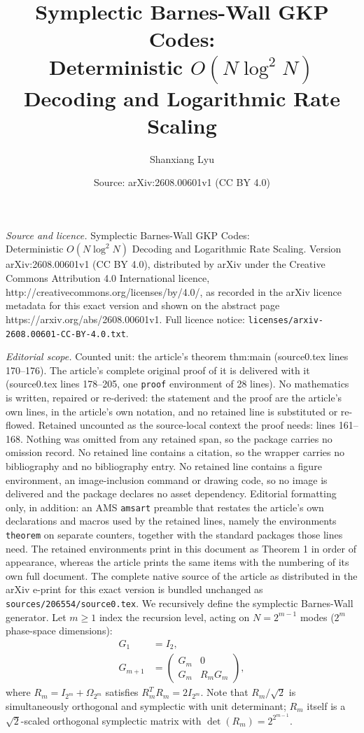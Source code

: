 \documentclass[10pt,a4paper]{amsart}
\title{Symplectic Barnes-Wall GKP Codes:\\Deterministic $O(N \log^2 N)$ Decoding and Logarithmic Rate Scaling}
\author{Shanxiang Lyu}
\date{Source: arXiv:2608.00601v1 (CC BY 4.0)}
\newcommand{\symp}{\Omega}
\begin{document}
\maketitle

\noindent\emph{Source and licence.} Symplectic Barnes-Wall GKP Codes:\\Deterministic $O(N \log^2 N)$ Decoding and Logarithmic Rate Scaling. Version arXiv:2608.00601v1 (CC BY 4.0), distributed by arXiv under the Creative Commons Attribution 4.0 International licence, http://creativecommons.org/licenses/by/4.0/, as recorded in the arXiv licence metadata for this exact version and shown on the abstract page https://arxiv.org/abs/2608.00601v1. Full licence notice: \texttt{licenses/arxiv-2608.00601-CC-BY-4.0.txt}.\par\smallskip

\noindent\textit{Editorial scope.} Counted unit: the article's theorem thm:main (source0.tex lines 170--176). The article's complete original proof of it is delivered with it (source0.tex lines 178--205, one \texttt{proof} environment of 28 lines). No mathematics is written, repaired or re-derived: the statement and the proof are the article's own lines, in the article's own notation, and no retained line is substituted or re-flowed.  Retained uncounted as the source-local context the proof needs: lines 161--168.  Nothing was omitted from any retained span, so the package carries no omission record.  No retained line contains a citation, so the wrapper carries no bibliography and no bibliography entry.  No retained line contains a figure environment, an image-inclusion command or drawing code, so no image is delivered and the package declares no asset dependency.  Editorial formatting only, in addition: an AMS \texttt{amsart} preamble that restates the article's own declarations and macros used by the retained lines, namely the environments \texttt{theorem} on separate counters, together with the standard packages those lines need.  The retained environments print in this document as Theorem 1 in order of appearance, whereas the article prints the same items with the numbering of its own full document.  The complete native source of the article as distributed in the arXiv e-print for this exact version is bundled unchanged as \texttt{sources/206554/source0.tex}.
We recursively define the symplectic Barnes-Wall generator. Let $m \geq 1$ index the recursion level, acting on $N = 2^{m-1}$ modes ($2^m$ phase-space dimensions):
%
\begin{align}
    G_1 &= I_2, \label{eq:g1} \\
    G_{m+1} &= \begin{pmatrix} G_m & 0 \\ G_m & R_m G_m \end{pmatrix}, \label{eq:grec}
\end{align}
%
where $R_m = I_{2^m} + \symp_{2^m}$ satisfies $R_m^T R_m = 2 I_{2^m}$. Note that $R_m/\sqrt{2}$ is simultaneously orthogonal and symplectic with unit determinant; $R_m$ itself is a $\sqrt{2}$-scaled orthogonal symplectic matrix with $\det(R_m) = 2^{2^{m-1}}$.
\end{document}
